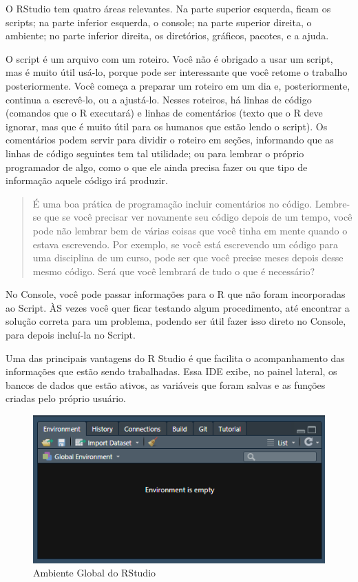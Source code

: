 \documentclass[
]{book}
\begin{document}
O RStudio tem quatro áreas relevantes. Na parte superior esquerda, ficam os scripts; na parte inferior esquerda, o console; na parte superior direita, o ambiente; no parte inferior direita, os diretórios, gráficos, pacotes, e a ajuda.

O script é um arquivo com um roteiro. Você não é obrigado a usar um script, mas é muito útil usá-lo, porque pode ser interessante que você retome o trabalho posteriormente. Você começa a preparar um roteiro em um dia e, posteriormente, continua a escrevê-lo, ou a ajustá-lo. Nesses roteiros, há linhas de código (comandos que o R executará) e linhas de comentários (texto que o R deve ignorar, mas que é muito útil para os humanos que estão lendo o script). Os comentários podem servir para dividir o roteiro em seções, informando que as linhas de código seguintes tem tal utilidade; ou para lembrar o próprio programador de algo, como o que ele ainda precisa fazer ou que tipo de informação aquele código irá produzir.

\begin{quote}
É uma boa prática de programação incluir comentários no código.
Lembre-se que se você precisar ver novamente seu código depois de um tempo, você pode não lembrar bem de várias coisas que você tinha em mente quando o estava escrevendo.
Por exemplo, se você está escrevendo um código para uma disciplina de um curso, pode ser que você precise meses depois desse mesmo código. Será que você lembrará de tudo o que é necessário?
\end{quote}

No Console, você pode passar informações para o R que não foram incorporadas ao Script. ÀS vezes você quer ficar testando algum procedimento, até encontrar a solução correta para um problema, podendo ser útil fazer isso direto no Console, para depois incluí-la no Script.

Uma das principais vantagens do R Studio é que facilita o acompanhamento das informações que estão sendo trabalhadas. Essa IDE exibe, no painel lateral, os bancos de dados que estão ativos, as variáveis que foram salvas e as funções criadas pelo próprio usuário.

\begin{figure}
\centering
\includegraphics{r-studio-environment.PNG}
\caption{Ambiente Global do RStudio}
\end{figure}
\end{document}
